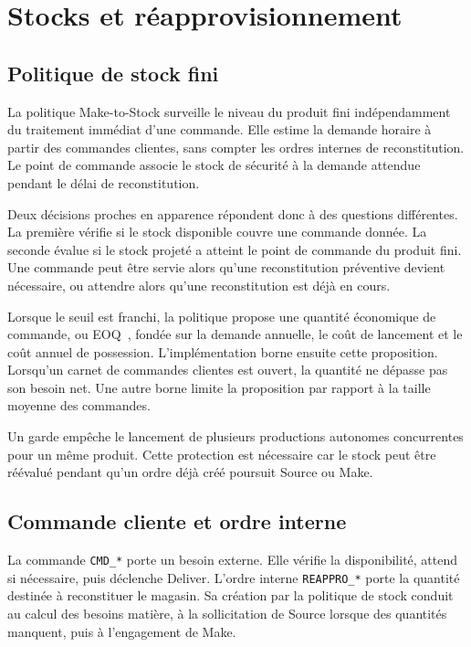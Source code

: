 \chapter{Stocks et réapprovisionnement}
\label{chap:stocks-reapprovisionnement}

\section{Politique de stock fini}

La politique Make-to-Stock surveille le niveau du produit fini indépendamment du traitement immédiat d'une commande. Elle estime la demande horaire à partir des commandes clientes, sans compter les ordres internes de reconstitution. Le point de commande associe le stock de sécurité à la demande attendue pendant le délai de reconstitution.

Deux décisions proches en apparence répondent donc à des questions différentes. La première vérifie si le stock disponible couvre une commande donnée. La seconde évalue si le stock projeté a atteint le point de commande du produit fini. Une commande peut être servie alors qu'une reconstitution préventive devient nécessaire, ou attendre alors qu'une reconstitution est déjà en cours.


Lorsque le seuil est franchi, la politique propose une quantité économique de commande, ou EOQ~\cite{harris1913,erlenkotter1990}, fondée sur la demande annuelle, le coût de lancement et le coût annuel de possession. L'implémentation borne ensuite cette proposition. Lorsqu'un carnet de commandes clientes est ouvert, la quantité ne dépasse pas son besoin net. Une autre borne limite la proposition par rapport à la taille moyenne des commandes.

Un garde empêche le lancement de plusieurs productions autonomes concurrentes pour un même produit. Cette protection est nécessaire car le stock peut être réévalué pendant qu'un ordre déjà créé poursuit Source ou Make.

\section{Commande cliente et ordre interne}

La commande \texttt{CMD\_*} porte un besoin externe. Elle vérifie la disponibilité, attend si nécessaire, puis déclenche Deliver. L'ordre interne \texttt{REAPPRO\_*} porte la quantité destinée à reconstituer le magasin. Sa création par la politique de stock conduit au calcul des besoins matière, à la sollicitation de Source lorsque des quantités manquent, puis à l'engagement de Make.

